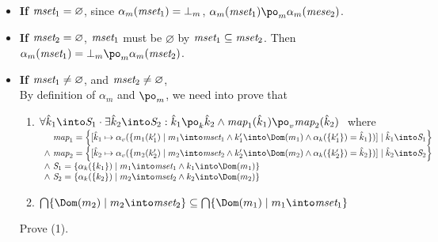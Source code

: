 \begin{itemize}
\item \textbf{If} $\emph{mset}_1 = \varnothing$,
since $\alpha_m(\emph{mset}_1) = \bot_m$,
$\alpha_m(\emph{mset}_1) \po_m \alpha_m(\emph{mese}_2)$.
\item \textbf{If} $\emph{mset}_2 = \varnothing$,
$\emph{mset}_1$ must be $\varnothing$ by $\emph{mset}_1 \subseteq \emph{mset}_2$.
Then $\alpha_m(\emph{mset}_1) = \bot_m \po_m \alpha_m(\emph{mset}_2)$.
\item\textbf{If} $\emph{mset}_1 \neq \varnothing$, and $\emph{mset}_2 \neq \varnothing$, \\
By definition of $\alpha_m$ and $\po_m$, we need into prove that
\begin{enumerate}[label=({\arabic*})]
\item $\forall \hat{k}_1 \into \emph{S}_1 \cdot \exists \hat{k}_2 \into \emph{S}_2:
\hat{k}_1 \po_k \hat{k}_2 \land \emph{map}_1(\hat{k}_1) \po_v \emph{map}_2(\hat{k}_2) ~ $
where \\
$\begin{array}{l}
\quad \emph{map}_1 = \left \{[ \hat{k}_1 \mapsto \alpha_{v}( \{ m_1(k_1') \mid m_1 \into \emph{mset}_1
\land k_1' \into \Dom(m_1) \land \alpha_k(\{k_1'\}) = \hat{k}_1 \} ) ]
\mid \hat{k}_1 \into \emph{S}_1  \right \}\\
\land~ \emph{map}_2 = \left \{[ \hat{k}_2 \mapsto \alpha_{v}( \{ m_2(k_2') \mid m_2 \into \emph{mset}_2
\land k_2' \into \Dom(m_2) \land \alpha_k(\{k_2'\}) = \hat{k}_2 \} ) ]
\mid \hat{k}_2 \into \emph{S}_2  \right \}\\
\land~ \emph{S}_1 = \{ \alpha_k(\{ k_1 \}) \mid m_1 \into \emph{mset}_1 \land k_1 \into \Dom(m_1) \} \\
\land~ \emph{S}_2 = \{ \alpha_k(\{ k_2 \}) \mid m_2 \into \emph{mset}_2 \land k_2 \into \Dom(m_2) \} \\
\end{array}$
\item $\bigcap\{ \Dom(m_2) \mid m_2 \into \emph{mset}_2\} \subseteq
\bigcap\{ \Dom(m_1) \mid m_1 \into \emph{mset}_1\}$
\end{enumerate}
Prove (1). 
\end{itemize}
